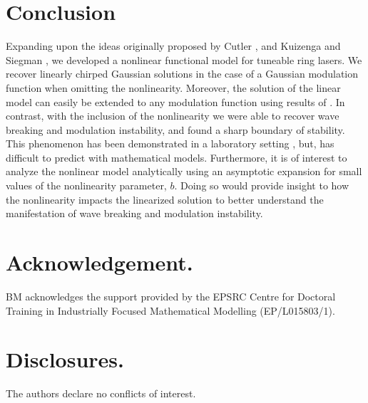 \documentclass[10pt,twocolumn,a4paper]{article}
\begin{document}
\section{Conclusion}
\label{sec:conclusion}
Expanding upon the ideas originally proposed by Cutler \cite{cutler1955}, and Kuizenga and Siegman \cite{kuizenga1970, kuizenga1970a, siegman1969}, we developed a nonlinear functional model for tuneable ring lasers. We recover linearly chirped Gaussian solutions in the case of a Gaussian modulation function when omitting the nonlinearity. Moreover, the solution of the linear model can easily be extended to any modulation function using results of \cite{calcaterra2008a}. In contrast, with the inclusion of the nonlinearity we were able to recover wave breaking and modulation instability, and found a sharp boundary of stability. This phenomenon has been demonstrated in a laboratory setting \cite{agrawal2013, anderson1992, finot2008, rothenberg1989b, tomlinson1985}, but, has difficult to predict with mathematical models. Furthermore, it is of interest to analyze the nonlinear model analytically using an asymptotic expansion for small values of the nonlinearity parameter, $b$. Doing so would provide insight to how the nonlinearity impacts the linearized solution to better understand the manifestation of wave breaking and modulation instability.

\section*{Acknowledgement.}
BM acknowledges the support provided by the EPSRC Centre for Doctoral Training in Industrially Focused Mathematical Modelling (EP/L015803/1).

\section*{Disclosures.}
The authors declare no conflicts of interest.


\end{document}
